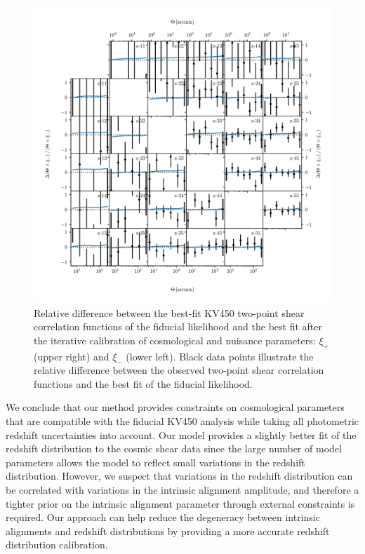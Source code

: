 \documentclass{aa}
\begin{document}
\begin{figure}
\centering
\includegraphics[width=\linewidth]{correlation_function.pdf}
\caption{Relative difference between the best-fit KV450 two-point shear correlation functions of the fiducial likelihood and the best fit after the iterative calibration of cosmological and nuisance parameters: $\xi_+$ (upper right) and $\xi_-$ (lower left). Black data points illustrate the relative difference between the observed two-point shear correlation functions and the best fit of the fiducial likelihood.}
\label{fig:correlation_function}
\end{figure}

We conclude that our method provides constraints on cosmological parameters that are compatible with the fiducial KV450 analysis while taking all photometric redshift uncertainties into account. Our model provides a slightly better fit of the redshift distribution to the cosmic shear data since the large number of model parameters allows the model to reflect small variations in the redshift distribution. However, we suspect that variations in the redshift distribution can be correlated with variations in the intrinsic alignment amplitude, and therefore a tighter prior on the intrinsic alignment parameter through external constraints is required. Our approach can help reduce the degeneracy between intrinsic alignments and redshift distributions by providing a more accurate redshift distribution calibration.
\end{document}
